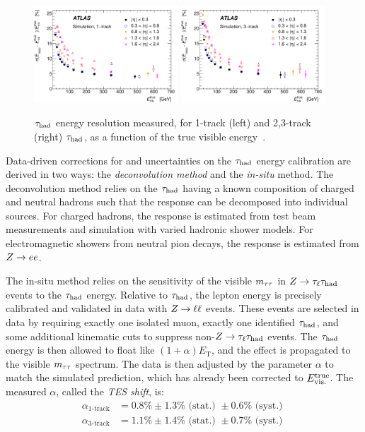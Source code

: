 \begin{figure}[tp]
  \centering
  \includegraphics[width=0.48\textwidth]{figures/PERF-2013-06/fig_16a}
  \includegraphics[width=0.48\textwidth]{figures/PERF-2013-06/fig_16b}
  \caption{$\tau_\text{had}$ energy resolution measured, for 1-track (left) and 2,3-track (right) $\tau_\text{had}$, as a function of the true visible energy~\cite{PERF-2013-06}.}
  \label{fig:taus-resolution}
\end{figure}

Data-driven corrections for and uncertainties on the $\tau_\text{had}$ energy calibration are derived in two ways: the \textit{deconvolution method} and the \textit{in-situ} method. The deconvolution method relies on the $\tau_\text{had}$ having a known composition of charged and neutral hadrons such that the response can be decomposed into individual sources. For charged hadrons, the response is estimated from test beam measurements and simulation with varied hadronic shower models. For electromagnetic showers from neutral pion decays, the response is estimated from $Z \rightarrow ee$.

The in-situ method relies on the sensitivity of the visible $m_{\tau\tau}$ in $Z\rightarrow\tau_\ell\tau_\text{had}$ events to the $\tau_\text{had}$ energy. Relative to $\tau_\text{had}$, the lepton energy is precisely calibrated and validated in data with $Z \rightarrow \ell\ell$ events. These events are selected in data by requiring exactly one isolated muon, exactly one identified $\tau_\text{had}$, and some additional kinematic cuts to suppress non-$Z\rightarrow\tau_\ell\tau_\text{had}$ events. The $\tau_\text{had}$ energy is then allowed to float like $(1 + \alpha)E_\text{T}$, and the effect is propagated to the visible $m_{\tau\tau}$ spectrum. The data is then adjusted by the parameter $\alpha$ to match the simulated prediction, which has already been corrected to $E_\text{vis.}^\text{true}$. The measured $\alpha$, called the \textit{TES shift}, is:
%
\begin{equation}
  \begin{split}
    \alpha_\text{1-track} &= 0.8\% \pm 1.3\% \text{ (stat.) } \pm 0.6\% \text{ (syst.) } \\
    \alpha_\text{3-track} &= 1.1\% \pm 1.4\% \text{ (stat.) } \pm 0.7\% \text{ (syst.) } \\
  \end{split}
  \label{eqn:taus-tesshift}
\end{equation}
%

